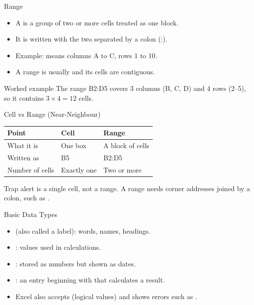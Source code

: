 \documentclass[aspectratio=169]{beamer}
\begin{document}
\begin{frame}{Range}
  \begin{itemize}
    \item A  is a group of two or more cells treated as one block.
    \item It is written with the two  separated by a
      colon (:).
    \item Example:  means columns A to C, rows 1 to 10.
    \item A range is usually  and its cells are contiguous.
  \end{itemize}
  \begin{exampleblock}{Worked example}
    The range B2:D5 covers 3 columns (B, C, D) and 4 rows (2--5), so it
    contains $3 \times 4 = 12$ cells.
  \end{exampleblock}
\end{frame}

\begin{frame}{Cell vs Range (Near-Neighbour)}
  \begin{center}
    \begin{tabular}{lll}
      \toprule
      \textbf{Point} & \textbf{Cell} & \textbf{Range} \\
      \midrule
      What it is & One box & A block of cells \\
      Written as & B5 & B2:D5 \\
      Number of cells & Exactly one & Two or more \\
      \bottomrule
    \end{tabular}
  \end{center}
  \vspace{0.3cm}
  \begin{alertblock}{Trap alert}
     is a single cell, not a range. A range needs  corner
    addresses joined by a colon, such as .
  \end{alertblock}
\end{frame}

\begin{frame}{Basic Data Types}
  \begin{itemize}
    \item {} (also called a label): words, names, headings.
    \item {}: values used in calculations.
    \item {}: stored as numbers but shown as dates.
    \item {}: an entry beginning with \key{=} that calculates a
      result.
    \item Excel also accepts  (logical values) and shows
      errors such as .
  \end{itemize}
\end{frame}
\end{document}
